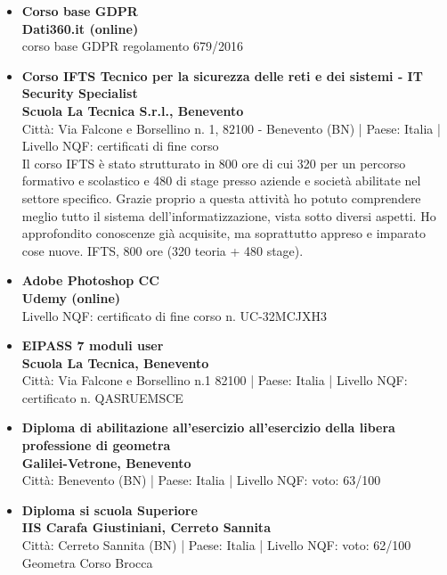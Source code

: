 \documentclass[a4paper,10pt]{article}
\begin{document}
\begin{itemize}[leftmargin=*]
  \item \textbf{\textcolor{mainblue}{Corso base GDPR}}\\
  \textbf {Dati360.it (online) \quad {[27/03/2020]}}\\
  corso base GDPR regolamento 679/2016

\newpage

  \item \textbf{\textcolor{mainblue}{Corso IFTS Tecnico per la sicurezza delle reti e dei sistemi - IT Security Specialist}}\\
  \textbf {Scuola La Tecnica S.r.l., Benevento \quad {[08/04/2019 – 20/12/2019]}}\\
  Città: Via Falcone e Borsellino n. 1, 82100 - Benevento (BN) | Paese: Italia | Livello NQF: certificati di fine corso \\
  Il corso IFTS è stato strutturato in 800 ore di cui 320 per un percorso formativo e scolastico e 480 di stage presso aziende e società abilitate nel settore specifico. Grazie proprio a questa attività ho potuto comprendere meglio tutto il sistema dell’informatizzazione, vista sotto diversi aspetti. Ho approfondito conoscenze già acquisite, ma soprattutto appreso e imparato cose nuove.
  IFTS, 800 ore (320 teoria + 480 stage).

  \item \textbf{\textcolor{mainblue}{Adobe Photoshop CC}}\\
  \textbf {Udemy (online) \quad {[29/03/2019]}}\\
  Livello NQF: certificato di fine corso n. UC-32MCJXH3

  \item \textbf{\textcolor{mainblue}{EIPASS 7 moduli user}}\\
  \textbf {Scuola La Tecnica, Benevento \quad {[07/09/2018]}}\\
  Città: Via Falcone e Borsellino n.1 82100 | Paese: Italia | Livello NQF: certificato n. QASRUEMSCE
  
  \item \textbf{\textcolor{mainblue}{Diploma di abilitazione all'esercizio all'esercizio della libera professione di geometra}}\\
  \textbf {Galilei-Vetrone, Benevento \quad {[17/12/2015]}}\\
  Città: Benevento (BN) | Paese: Italia | Livello NQF: voto: 63/100

  \item \textbf{\textcolor{mainblue}{Diploma si scuola Superiore}}\\
  \textbf {IIS Carafa Giustiniani, Cerreto Sannita \quad {[06/07/2011]}}\\
  Città: Cerreto Sannita (BN) | Paese: Italia | Livello NQF: voto: 62/100\\
  Geometra Corso Brocca


\end{itemize}
\end{document}
